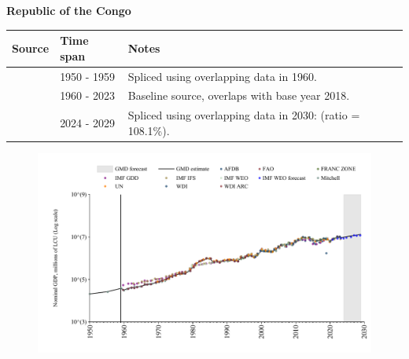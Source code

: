 \documentclass[12pt,a4paper,landscape]{article}
\begin{document}
\begin{adjustbox}{max totalsize={\paperwidth}{\paperheight},center}
\begin{minipage}[t][\textheight][t]{\textwidth}
\vspace*{0.5cm}
{}
\begin{center}
{\Large\bfseries Republic of the Congo}
\end{center}
\vspace{0.5cm}
\begin{table}[H]
\centering
\small
\begin{tabular}{|l|l|l|}
\hline
\textbf{Source} & \textbf{Time span} & \textbf{Notes} \\
\hline
\rowcolor{white}\cite{Mitchell}& 1950 - 1959 &Spliced using overlapping data in 1960.\\
\rowcolor{lightgray}\cite{WDI}& 1960 - 2023 &Baseline source, overlaps with base year 2018.\\
\rowcolor{white}\cite{IMF_WEO_forecast}& 2024 - 2029 &Spliced using overlapping data in 2030: (ratio = 108.1\%).\\
\hline
\end{tabular}
\end{table}
\begin{figure}[H]
\centering
\includegraphics[width=\textwidth,height=0.6\textheight,keepaspectratio]{graphs/COG_nGDP.pdf}
\end{figure}
\end{minipage}
\end{adjustbox}
\end{document}
